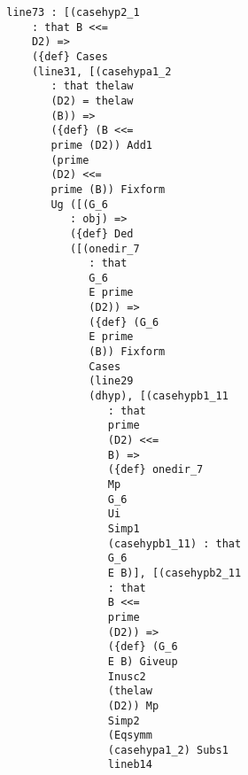 \documentclass[12pt]{article}
\begin{document}
\begin{verbatim}
                           line73 : [(casehyp2_1 
                               : that B <<= 
                               D2) => 
                               ({def} Cases 
                               (line31, [(casehypa1_2 
                                  : that thelaw 
                                  (D2) = thelaw 
                                  (B)) => 
                                  ({def} (B <<= 
                                  prime (D2)) Add1 
                                  (prime 
                                  (D2) <<= 
                                  prime (B)) Fixform 
                                  Ug ([(G_6 
                                     : obj) => 
                                     ({def} Ded 
                                     ([(onedir_7 
                                        : that 
                                        G_6 
                                        E prime 
                                        (D2)) => 
                                        ({def} (G_6 
                                        E prime 
                                        (B)) Fixform 
                                        Cases 
                                        (line29 
                                        (dhyp), [(casehypb1_11 
                                           : that 
                                           prime 
                                           (D2) <<= 
                                           B) => 
                                           ({def} onedir_7 
                                           Mp 
                                           G_6 
                                           Ui 
                                           Simp1 
                                           (casehypb1_11) : that 
                                           G_6 
                                           E B)], [(casehypb2_11 
                                           : that 
                                           B <<= 
                                           prime 
                                           (D2)) => 
                                           ({def} (G_6 
                                           E B) Giveup 
                                           Inusc2 
                                           (thelaw 
                                           (D2)) Mp 
                                           Simp2 
                                           (Eqsymm 
                                           (casehypa1_2) Subs1 
                                           lineb14 

\end{verbatim}
\end{document}
